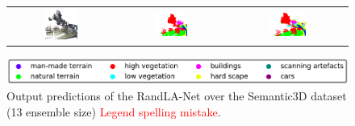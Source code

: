 \begin{figure}[h!]
\begin{tabular}{ccc}
            \includegraphics[width=0.33\textwidth, height=0.18\textheight]{images/seg_output/sem3d_seg_output/3_RGB.pdf} &
            \includegraphics[width=0.33\textwidth, height=0.18\textheight]{images/seg_output/sem3d_seg_output/3_GT.pdf}& 
            \includegraphics[width=0.33\textwidth, height=0.18\textheight]{images/seg_output/sem3d_seg_output/3_Pred.pdf}\\
        \end{tabular}
        \includegraphics[scale=0.45]{images/legend.png}
        \caption{Output predictions of the RandLA-Net over the Semantic3D dataset (13 ensemble size) \textcolor{red}{Legend spelling mistake}.}
        \label{fig:deepensemble_vis_sem3d}
    \end{figure}

    
